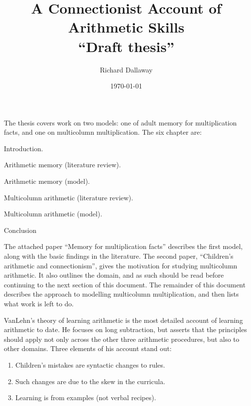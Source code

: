 



\author{Richard Dallaway}
\date{\today}
\title{A Connectionist Account of Arithmetic Skills\\``Draft thesis''}
\maketitle


The thesis covers work on two models: one of adult
memory for multiplication facts, and one on multicolumn multiplication.
The six chapter are:
\begin{APAenumerate}
\item Introduction.
\item Arithmetic memory (literature review).
\item Arithmetic memory (model).
\item Multicolumn arithmetic (literature review).
\item Multicolumn arithmetic (model).
\item Conclusion
\end{APAenumerate}

The attached paper ``Memory for multiplication facts'' describes the first
model, along with the basic findings in the literature.  The second paper,
``Children's arithmetic and connectionism'', gives the motivation for
studying multicolumn arithmetic.  It also outlines the domain, and as such
should be read before continuing to the next section of this document. The
remainder of this document describes the approach to modelling
multicolumn multiplication, and then lists what work is left to do.


VanLehn's theory of learning arithmetic is the most detailed account of
learning arithmetic to date.  He focuses on long subtraction, but asserts
that the principles should apply not only across the other three arithmetic
procedures, but also to other domains.  Three elements of his account stand
out:

\begin{enumerate}
\item Children's mistakes are syntactic changes to rules.
\item Such changes are due to the skew in the curricula.
\item Learning is from examples (not verbal recipes).
\end{enumerate}

